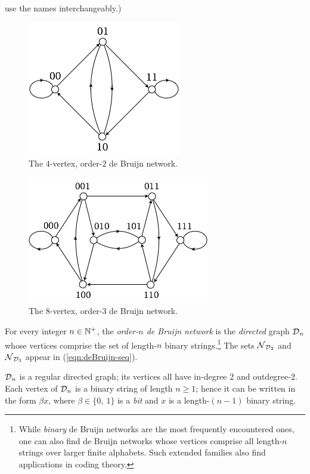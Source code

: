 use the names interchangeably.)
\begin{figure}[hbt]
\begin{center}
       \includegraphics[scale=0.5]{FiguresGraph/dB2by2}
       \caption{The $4$-vertex, order-$2$ de Bruijn network.}
  \label{fig:dB2by2}
\end{center}
\end{figure}

\begin{figure}[hbt]
\begin{center}
       \includegraphics[scale=0.6]{FiguresGraph/dB2by3}
       \caption{The $8$-vertex, order-$3$ de Bruijn network.}
  \label{fig:dB2by3}
\end{center}
\end{figure}

For every integer $n \in \mathbb{N}^+$, the {\it order-$n$ de Bruijn network}
is the {\em directed} graph $\mbox{$\cal D$}_n$ whose vertices comprise the set of
length-$n$ binary strings.\footnote{While {\em binary} de Bruijn
  networks are the most frequently encountered ones, one can also find
  de Bruijn networks whose vertices comprise all length-$n$ strings over
  larger finite alphabets.  Such extended families also find
  applications in coding theory.}  The sets $\mbox{$\cal N$}_{\mbox{{\scriptsize $\cal D$}}_2}$ and
$\mbox{$\cal N$}_{\mbox{{\scriptsize $\cal D$}}_3}$ appear in (\ref{eqn:deBruijn-seq}).


$\mbox{$\cal D$}_n$ is a regular directed graph; its vertices all have in-degree $2$
and outdegree-$2$.  Each vertex of $\mbox{$\cal D$}_n$ is a binary string of
length $n \geq 1$; hence it can be written in the form $\beta x$,
where $\beta \in \{0, \ 1\}$ is a {\it bit} and $x$ is a length-$(n-1)$ binary string.

